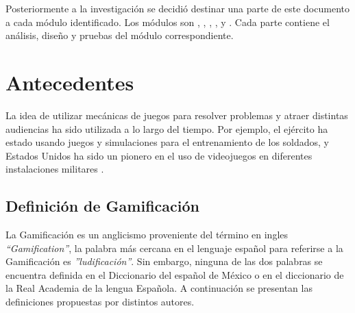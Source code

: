 \noindent Posteriormente a la investigación se decidió destinar una parte de este documento a cada módulo identificado. Los módulos son , , , ,  y . Cada parte contiene el análisis, diseño y pruebas del módulo correspondiente.\\
\clearpage



\section{Antecedentes}
\label{sec:antecedentes}

La idea de utilizar mecánicas de juegos para resolver problemas y atraer distintas audiencias ha sido utilizada a lo largo del tiempo. Por ejemplo, el ejército ha estado usando juegos y simulaciones para el entrenamiento de los soldados, y Estados Unidos ha sido un pionero en el uso de videojuegos en diferentes instalaciones militares \cite{GamByDesign}.


\subsection{Definición de Gamificación}

La Gamificación es un anglicismo proveniente del término en ingles {\it ``Gamification''}, la palabra más cercana en el lenguaje español para referirse a la Gamificación es {\it ''ludificación''}. Sin embargo, ninguna de las dos palabras se encuentra definida en el Diccionario del español de México o en el diccionario de la Real Academia de la lengua Española. A continuación se presentan las definiciones propuestas por distintos autores.


